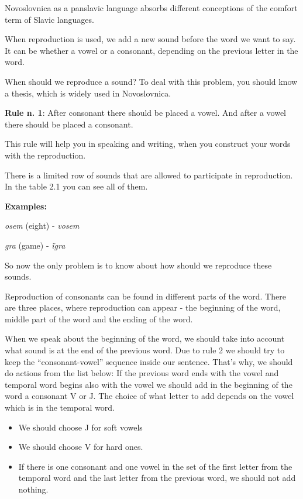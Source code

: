 Novoslovnica as a panslavic language absorbs different conceptions of the comfort term of Slavic languages.

When reproduction is used, we add a new sound before the word we want to say. It can be whether a vowel or a consonant, depending on the previous letter in the word.

When should we reproduce a sound? To deal with this problem, you should know a thesis, which is widely used in Novoslovnica.

\textbf{Rule n. 1}: After consonant there should be placed a vowel. And after a vowel there should be placed a consonant.

This rule will help you in speaking and writing, when you construct your words with the reproduction.

There is a limited row of sounds that are allowed to participate in reproduction. In the table 2.1 you can see all of them.

\textbf{Examples:}

\textit{osem} (eight) \textipa{[‘osEm]} - \textit{vosem} \textipa{[‘vosEm]}

\textit{gra} (game) \textipa{[Hra]} - \textit{ïgra} \textipa{[i’Hra]}

So now the only problem is to know about how should we reproduce these sounds.

Reproduction of consonants can be found in different parts of the word. There are three places, where reproduction can appear - the beginning of the word, middle part of the word and the ending of the word.

When we speak about the beginning of the word, we should take into account what sound is at the end of the previous word. Due to rule 2 we should try to keep the “consonant-vowel” sequence inside our sentence. That’s why, we should do actions from the list below:
If the previous word ends with the vowel and temporal word begins also with the vowel we should add in the beginning of the word a consonant V or J. The choice of what letter to add depends on the vowel which is in the temporal word.

\begin{itemize}
	\item We should choose J for soft vowels
	\item We should choose V for hard ones.
	\item If there is one consonant and one vowel in the set of the first letter from the temporal word and the last letter from the previous word, we should not add nothing.
\end{itemize}

